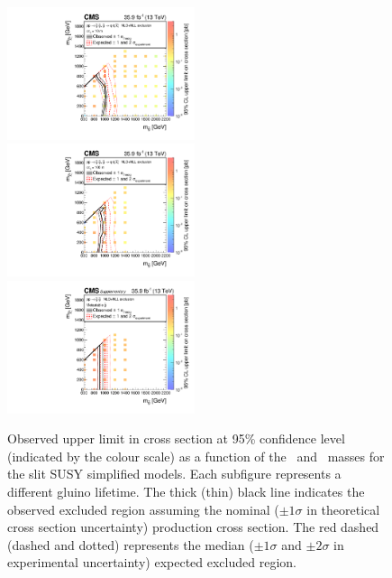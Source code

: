 \begin{figure}[!t]
\centering
\includegraphics[width=0.49\textwidth]{figs/results/T1qqqqLL10000XSEC}~
\includegraphics[width=0.49\textwidth]{figs/results/T1qqqqLL100000XSEC}\\
\includegraphics[width=0.49\textwidth]{figs/results/T1qqqqLLStableXSEC}
\caption{Observed upper limit in cross section at 95\% confidence level 
(indicated by the colour scale) as a function of the \gluino~and 
\neutralino~masses for the slit SUSY simplified models. Each subfigure 
represents a different gluino lifetime. The thick (thin) black line indicates 
the observed excluded region assuming the nominal ($\pm1\sigma$ in theoretical 
cross section uncertainty) production cross section. The red dashed (dashed and 
dotted) represents the median ($\pm1\sigma$ and $\pm2\sigma$ in experimental 
uncertainty) expected excluded region.}
\label{fig:limits-individual-3}
\end{figure}
